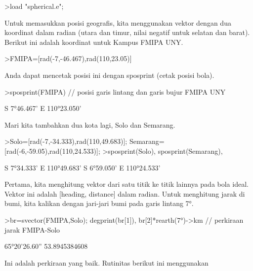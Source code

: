 \documentclass[a4paper,10pt]{article}
\begin{document}
\begin{eulernotebook}
\begin{eulercomment}
\begin{eulercomment}
\begin{eulercomment}
\begin{eulercomment}
\begin{eulerprompt}
>load "spherical.e";
\end{eulerprompt}
\begin{eulercomment}
Untuk memasukkan posisi geografis, kita menggunakan vektor dengan dua
koordinat dalam radian (utara dan timur, nilai negatif untuk selatan
dan barat). Berikut ini adalah koordinat untuk Kampus FMIPA UNY.
\end{eulercomment}
\begin{eulerprompt}
>FMIPA=[rad(-7,-46.467),rad(110,23.05)]
\end{eulerprompt}
\begin{euleroutput}
  [-0.13569,  1.92657]
\end{euleroutput}
\begin{eulercomment}
Anda dapat mencetak posisi ini dengan sposprint (cetak posisi bola).
\end{eulercomment}
\begin{eulerprompt}
>sposprint(FMIPA) // posisi garis lintang dan garis bujur FMIPA UNY
\end{eulerprompt}
\begin{euleroutput}
  S 7°46.467' E 110°23.050'
\end{euleroutput}
\begin{eulercomment}
Mari kita tambahkan dua kota lagi, Solo dan Semarang.
\end{eulercomment}
\begin{eulerprompt}
>Solo=[rad(-7,-34.333),rad(110,49.683)]; Semarang=[rad(-6,-59.05),rad(110,24.533)];
>sposprint(Solo), sposprint(Semarang),
\end{eulerprompt}
\begin{euleroutput}
  S 7°34.333' E 110°49.683'
  S 6°59.050' E 110°24.533'
\end{euleroutput}
\begin{eulercomment}
Pertama, kita menghitung vektor dari satu titik ke titik lainnya pada
bola ideal. Vektor ini adalah [heading, distance] dalam radian. Untuk
menghitung jarak di bumi, kita kalikan dengan jari-jari bumi pada
garis lintang 7°.
\end{eulercomment}
\begin{eulerprompt}
>br=svector(FMIPA,Solo); degprint(br[1]), br[2]*rearth(7°)->km // perkiraan jarak FMIPA-Solo
\end{eulerprompt}
\begin{euleroutput}
  65°20'26.60''
  53.8945384608
\end{euleroutput}
\begin{eulercomment}
Ini adalah perkiraan yang baik. Rutinitas berikut ini menggunakan

\end{eulercomment}
\end{eulercomment}
\end{eulercomment}
\end{eulercomment}
\end{eulercomment}
\end{eulernotebook}
\end{document}
